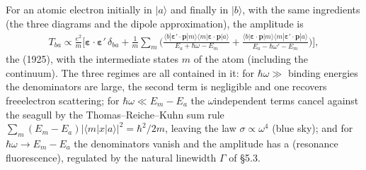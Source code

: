 \documentclass[letterpaper,10pt,english]{jupyterBook}
\begin{document}
\sphinxAtStartPar
{} For an atomic electron initially in \(|a\rangle\) and finally in \(|b\rangle\), with the same ingredients (the three diagrams and the dipole approximation), the amplitude is
\begin{equation*}
\begin{split}
T_{ba}\propto\frac{e^2}{m}\Big[\boldsymbol\varepsilon\!\cdot\!\boldsymbol\varepsilon'\,\delta_{ba}+\frac1m\sum_m\Big(\frac{\langle b|\boldsymbol\varepsilon'\!\cdot\!\mathbf p|m\rangle\langle m|\boldsymbol\varepsilon\!\cdot\!\mathbf p|a\rangle}{E_a+\hbar\omega-E_m}+\frac{\langle b|\boldsymbol\varepsilon\!\cdot\!\mathbf p|m\rangle\langle m|\boldsymbol\varepsilon'\!\cdot\!\mathbf p|a\rangle}{E_a-\hbar\omega'-E_m}\Big)\Big],
\end{split}
\end{equation*}
\sphinxAtStartPar
the  (1925), with the intermediate states \(m\) of the atom (including the continuum). The three regimes are all contained in it: for \(\hbar\omega\gg\) binding energies the denominators are large, the second term is negligible and one recovers free\sphinxhyphen{}electron  scattering; for \(\hbar\omega\ll E_m-E_a\) the \(\omega\)\sphinxhyphen{}independent terms cancel against the seagull by the Thomas–Reiche–Kuhn sum rule \(\sum_m(E_m-E_a)|\langle m|x|a\rangle|^2=\hbar^2/2m\), leaving the  law \(\sigma\propto\omega^4\) (blue sky); and for \(\hbar\omega\to E_m-E_a\) the denominators vanish and the amplitude has a  (resonance fluorescence), regulated by the natural linewidth \(\Gamma\) of §5.3.

\sphinxstepscope
\end{document}
